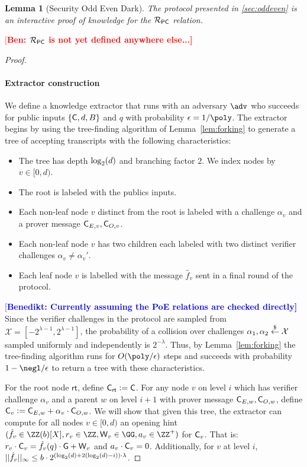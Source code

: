 \documentclass[10pt,conference]{IEEEtran}
\theoremstyle{Definition}
\newtheorem{lemma}{Lemma}
\newcommand{\ben}[1]{{\textcolor{red}{[\bf Ben: #1]}}}
\newcommand{\benedikt}[1]{{\textcolor{blue}{[\bf Benedikt: #1]}}}
\newcommand{\ben}[1]{}
\begin{document}
	
\begin{lemma}[Security Odd Even Dark]
	The protocol presented in \cref{sec:oddeven} is an interactive proof of knowledge for the $\mathcal{R}_{\mathsf{PC}}$ relation.
\end{lemma}
\ben{$\mathcal{R}_{\mathsf{PC}}$ is not yet defined anywhere else...}
\begin{proof}

~\paragraph{Extractor construction}
		We define a knowledge extractor that runs with an adversary $\adv$ who succeeds for public inputs $\{\mathsf{C},d,B \}$ and $q$ with probability $\epsilon = 1/\poly$. The extractor begins by using the tree-finding algorithm of Lemma~\ref{lem:forking} to generate a tree of accepting transcripts with the following characteristics: 
\begin{itemize}
\item The tree has depth $\log_2(d)$ and branching factor $2$. We index nodes by $v \in [0, d)$.
\item The root is labeled with the publics inputs. 
\item Each non-leaf node $v$ distinct from the root is labeled with a challenge $\alpha_{v}$ and a prover message $\mathsf{C}_{E,v},\mathsf{C}_{O,v}$.
\item Each non-leaf node $v$ has two children each labeled with two distinct verifier challenges 
$\alpha_{v} \neq \alpha_{v}'$.
\item Each leaf node $v$ is labelled with the message $\hat{f}_v$ sent in a final round of the protocol. 
\end{itemize} 

\benedikt{Currently assuming the PoE relations are checked directly}
Since the verifier challenges in the protocol are sampled from $\mathcal{X} = [-2^{\lambda -1}, 2^{\lambda -1}]$, the probability of a collision over challenges $\alpha_1, \alpha_2 \overset{\$}{\gets} \mathcal{X}$ sampled uniformly and independently is $2^{-\lambda}$. Thus, by Lemma~\ref{lem:forking} the tree-finding algorithm runs for $O(\poly/\epsilon)$ steps and succeeds with probability $1 - \negl/\epsilon$ to return a tree with these characteristics.

For the root node $\textsf{rt}$, define $\mathsf{C}_\textsf{rt} \mathrel{\mathop:}= \mathsf{C}$. For any node $v$ on level $i$ which has verifier challenge $\alpha_v$ and a parent $w$ on level $i+1$ with prover message $\mathsf{C}_{E,w},\mathsf{C}_{O,w}$, define $\mathsf{C}_v \mathrel{\mathop:}= \mathsf{C}_{E,w} + \alpha_v \cdot \mathsf{C}_{O,w}$.
We will show that given this tree, the extractor can compute for all nodes $v \in [0, d)$ an opening hint $(\hat{f}_v \in \ZZ(b)[X],\denom_v \in \ZZ,\gr{W}_v \in \GG,a_v \in \ZZ^+)$ for $\mathsf{C}_v$. That is: $r_v \cdot \mathsf{C}_v=\hat{f}_v(q) \cdot \mathsf{G} +\mathsf{W}_v$ and $a_v \cdot \mathsf{C}_v=0$. Additionally, for $v$ at level $i$, $||\hat{f}_v||_\infty \leq b\cdot 2^{(\log_2(d)+2(\log_2(d)-i)) \cdot \lambda}$.


\end{proof}
\end{document}
